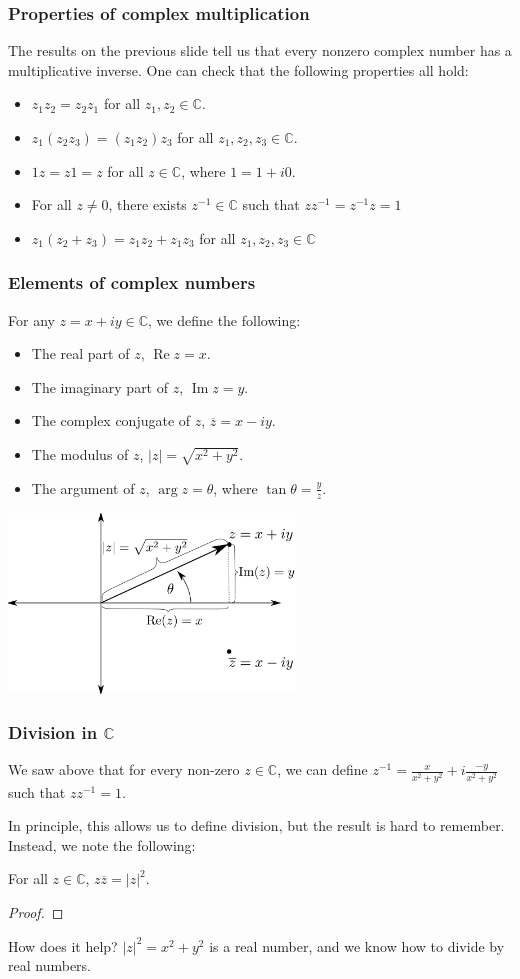 \documentclass[11pt,t]{beamer}
\newcommand{\C}{\mathbb{C}}
\renewcommand{\Re}{\operatorname{Re}}
\renewcommand{\Im}{\operatorname{Im}}
\newcommand{\abs}[1]{\lvert #1\rvert}
\begin{document}
\begin{frame}\frametitle{Properties of complex multiplication}
 The results on the previous slide tell us that every nonzero complex number has a multiplicative inverse. One can check that the following properties all hold:
\begin{itemize}
 \item $z_1z_2=z_2z_1$ for all $z_1,z_2\in\C$.
 \item $z_1(z_2z_3)=(z_1z_2)z_3$ for all $z_1,z_2,z_3\in\C$.
 \item $1z = z1 = z$ for all $z\in\C$, where $1 = 1+i0$.
 \item For all $z\neq 0$, there exists $z^{-1}\in\C$ such that $zz^{-1}=z^{-1}z=1$
 \item $z_1(z_2+z_3) = z_1z_2+z_1z_3$ for all $z_1,z_2,z_3\in\C$
\end{itemize}

\end{frame}
\begin{frame}\frametitle{Elements of complex numbers}
For any $z=x+iy\in \C$, we define the following:
\begin{itemize}
\item The \alert{real part} of $z$, $\Re z = x$.
\item The \alert{imaginary part} of $z$, $\Im z = y$.
\item The \alert{complex conjugate} of $z$, $\overline{z} = x-iy$.
\item The \alert{modulus} of $z$, $\abs{z} = \sqrt{x^2+y^2}$.
\item The \alert{argument} of $z$, $\arg z = \theta$, where $\tan \theta = \frac{y}{z}$.
\end{itemize}
\begin{center}
\includegraphics[width=3in]{argand.pdf}
\end{center}
\end{frame}
\begin{frame}
\frametitle{Division in $\C$}
We saw above that for every non-zero $z\in\C$, we can define $z^{-1} = \frac{x}{x^2+y^2}+i\frac{-y}{x^2+y^2}$ such that $zz^{-1}=1$.

In principle, this allows us to define division, but the result is hard to remember. Instead, we note the following:
\begin{theorem}
For all $z\in\C$, $z\overline{z} = \abs{z}^2$.
\end{theorem}
\begin{proof}
\vspace{0.5in}
\end{proof}
How does it help? $\abs{z}^2 = x^2+y^2$ is a \alert{real number}, and we know how to divide by real numbers.
\end{frame}
\end{document}
